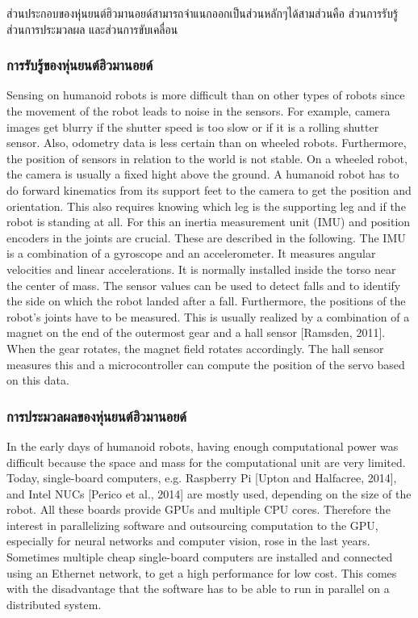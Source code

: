 ส่วนประกอบของหุ่นยนต์ฮิวมานอยด์สามารถจำแนกออกเป็นส่วนหลักๆได้สามส่วนคือ 
ส่วนการรับรู้ ส่วนการประมวลผล และส่วนการขับเคลื่อน

\subsubsection*{การรับรู้ของหุ่นยนต์ฮิวมานอยด์}
Sensing on humanoid robots is more difficult than on other types of robots since the
movement of the robot leads to noise in the sensors.  For example, camera images
get blurry if the shutter speed is too slow or if it is a rolling shutter sensor.  Also,
odometry  data  is  less  certain  than  on  wheeled  robots.   Furthermore,  the  position
of sensors in relation to the world is not stable.  On a wheeled robot, the camera
is  usually  a  fixed  hight  above  the  ground.   A  humanoid  robot  has  to  do  forward
kinematics from its support feet to the camera to get the position and orientation.
This also requires knowing which leg is the supporting leg and if the robot is standing
at all. For this an inertia measurement unit (IMU) and position encoders in the joints
are crucial.  These are described in the following.
The  IMU  is  a  combination  of  a  gyroscope  and  an  accelerometer.   It  measures
angular velocities and linear accelerations.  It is normally installed inside the torso
near the center of mass.  The sensor values can be used to detect falls and to identify
the side on which the robot landed after a fall.
Furthermore,  the  positions  of  the  robot’s  joints  have  to  be  measured.   This  is
usually  realized  by  a  combination  of  a  magnet  on  the  end  of  the  outermost  gear
and a hall sensor [Ramsden, 2011].  When the gear rotates, the magnet field rotates
accordingly.  The hall sensor measures this and a microcontroller can compute the
position of the servo based on this data.
\subsubsection*{การประมวลผลของหุ่นยนต์ฮิวมานอยด์}
In  the  early  days  of  humanoid  robots,  having  enough  computational  power  was
difficult because the  space and  mass for  the computational  unit are  very  limited.
Today, single-board computers, e.g.  Raspberry Pi [Upton and Halfacree, 2014], and
Intel NUCs [Perico et al., 2014] are mostly used, depending on the size of the robot.
All these boards provide GPUs and multiple CPU cores.  Therefore the interest in
parallelizing software and outsourcing computation to the GPU, especially for neural
networks  and  computer  vision,  rose  in  the  last  years.   Sometimes  multiple  cheap
single-board computers are installed and connected using an Ethernet network, to
get  a  high  performance  for  low  cost.   This  comes  with  the  disadvantage  that  the
software has to be able to run in parallel on a distributed system.
